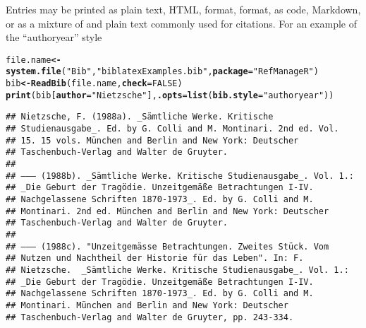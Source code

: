 \documentclass[article]{jss}\usepackage[]{graphicx}\usepackage[]{color}
\makeatletter
\newcommand{\hlnum}[1]{\textcolor[rgb]{0.125,0.125,1}{#1}}%
\newcommand{\hlstr}[1]{\textcolor[rgb]{0.125,0.125,1}{#1}}%
\newcommand{\hlstd}[1]{\textcolor[rgb]{0.251,0.251,0.282}{#1}}%
\newcommand{\hlkwb}[1]{\textcolor[rgb]{0.439,0.251,1}{\textbf{#1}}}%
\newcommand{\hlkwc}[1]{\textcolor[rgb]{0.529,0,0.184}{\textbf{#1}}}%
\newcommand{\hlkwd}[1]{\textcolor[rgb]{0.251,0.251,0.282}{\textbf{#1}}}%
\newenvironment{kframe}{%
 \def\at@end@of@kframe{}%
 \ifinner\ifhmode%
  \def\at@end@of@kframe{\end{minipage}}%
  \begin{minipage}{\columnwidth}%
 \fi\fi%
 \def\FrameCommand##1{\hskip\@totalleftmargin \hskip-\fboxsep
 \colorbox{shadecolor}{##1}\hskip-\fboxsep
     \hskip-\linewidth \hskip-\@totalleftmargin \hskip\columnwidth}%
 \MakeFramed {\advance\hsize-\width
   \@totalleftmargin\z@ \linewidth\hsize
   \@setminipage}}%
 {\par\unskip\endMakeFramed%
 \at@end@of@kframe}
\newenvironment{knitrout}{}{} %
\makeatother
\begin{document}
Entries may be printed as plain text, HTML, \Bibtex{} format, \Biblatex{} format, as \R{} code, Markdown, or as a mixture of \Bibtex{} and plain text commonly used for citations.  For an example of the ``authoryear'' style
\begin{knitrout}
\color{fgcolor}\begin{kframe}
\begin{alltt}
\hlstd{file.name} \hlkwb{<-} \hlkwd{system.file}\hlstd{(}\hlstr{"Bib"}\hlstd{,} \hlstr{"biblatexExamples.bib"}\hlstd{,} \hlkwc{package} \hlstd{=} \hlstr{"RefManageR"}\hlstd{)}
\hlstd{bib} \hlkwb{<-} \hlkwd{ReadBib}\hlstd{(file.name,} \hlkwc{check} \hlstd{=} \hlnum{FALSE}\hlstd{)}
\hlkwd{print}\hlstd{(bib[}\hlkwc{author} \hlstd{=} \hlstr{"Nietzsche"}\hlstd{],} \hlkwc{.opts} \hlstd{=} \hlkwd{list}\hlstd{(}\hlkwc{bib.style} \hlstd{=} \hlstr{"authoryear"}\hlstd{))}
\end{alltt}
\begin{verbatim}
## Nietzsche, F. (1988a). _Sämtliche Werke. Kritische
## Studienausgabe_. Ed. by G. Colli and M. Montinari. 2nd ed. Vol.
## 15. 15 vols. München and Berlin and New York: Deutscher
## Taschenbuch-Verlag and Walter de Gruyter.
## 
## —–— (1988b). _Sämtliche Werke. Kritische Studienausgabe_. Vol. 1.:
## _Die Geburt der Tragödie. Unzeitgemäße Betrachtungen I-IV.
## Nachgelassene Schriften 1870-1973_. Ed. by G. Colli and M.
## Montinari. 2nd ed. München and Berlin and New York: Deutscher
## Taschenbuch-Verlag and Walter de Gruyter.
## 
## —–— (1988c). "Unzeitgemässe Betrachtungen. Zweites Stück. Vom
## Nutzen und Nachtheil der Historie für das Leben". In: F.
## Nietzsche.  _Sämtliche Werke. Kritische Studienausgabe_. Vol. 1.:
## _Die Geburt der Tragödie. Unzeitgemäße Betrachtungen I-IV.
## Nachgelassene Schriften 1870-1973_. Ed. by G. Colli and M.
## Montinari. München and Berlin and New York: Deutscher
## Taschenbuch-Verlag and Walter de Gruyter, pp. 243-334.
\end{verbatim}
\end{kframe}
\end{knitrout}
\end{document}
